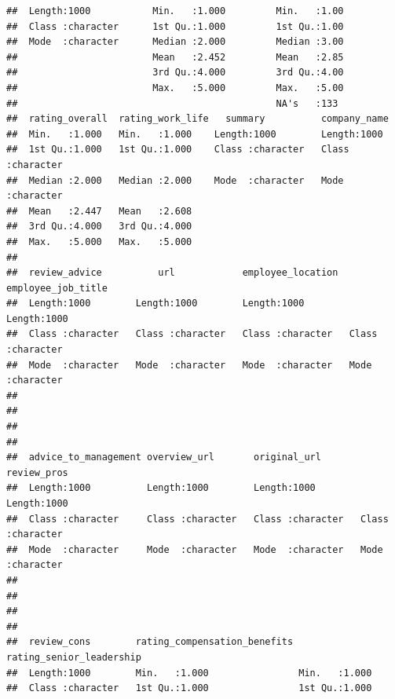 \documentclass[
]{article}
\begin{document}
\begin{verbatim}
##  Length:1000           Min.   :1.000         Min.   :1.00              
##  Class :character      1st Qu.:1.000         1st Qu.:1.00              
##  Mode  :character      Median :2.000         Median :3.00              
##                        Mean   :2.452         Mean   :2.85              
##                        3rd Qu.:4.000         3rd Qu.:4.00              
##                        Max.   :5.000         Max.   :5.00              
##                                              NA's   :133               
##  rating_overall  rating_work_life   summary          company_name      
##  Min.   :1.000   Min.   :1.000    Length:1000        Length:1000       
##  1st Qu.:1.000   1st Qu.:1.000    Class :character   Class :character  
##  Median :2.000   Median :2.000    Mode  :character   Mode  :character  
##  Mean   :2.447   Mean   :2.608                                         
##  3rd Qu.:4.000   3rd Qu.:4.000                                         
##  Max.   :5.000   Max.   :5.000                                         
##                                                                        
##  review_advice          url            employee_location  employee_job_title
##  Length:1000        Length:1000        Length:1000        Length:1000       
##  Class :character   Class :character   Class :character   Class :character  
##  Mode  :character   Mode  :character   Mode  :character   Mode  :character  
##                                                                             
##                                                                             
##                                                                             
##                                                                             
##  advice_to_management overview_url       original_url       review_pros       
##  Length:1000          Length:1000        Length:1000        Length:1000       
##  Class :character     Class :character   Class :character   Class :character  
##  Mode  :character     Mode  :character   Mode  :character   Mode  :character  
##                                                                               
##                                                                               
##                                                                               
##                                                                               
##  review_cons        rating_compensation_benefits rating_senior_leadership
##  Length:1000        Min.   :1.000                Min.   :1.000           
##  Class :character   1st Qu.:1.000                1st Qu.:1.000           

\end{verbatim}
\end{document}

